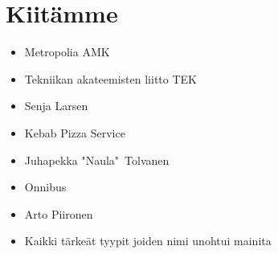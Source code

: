 %	
%	  

\section*{Kiitämme}
\begin{itemize}
\item Metropolia AMK
\item Tekniikan akateemisten liitto TEK
\item Senja Larsen
\item Kebab Pizza Service
\item Juhapekka "Naula"\ Tolvanen
\item Onnibus
\item Arto Piironen
\item Kaikki tärkeät tyypit joiden nimi unohtui mainita
\end{itemize}


